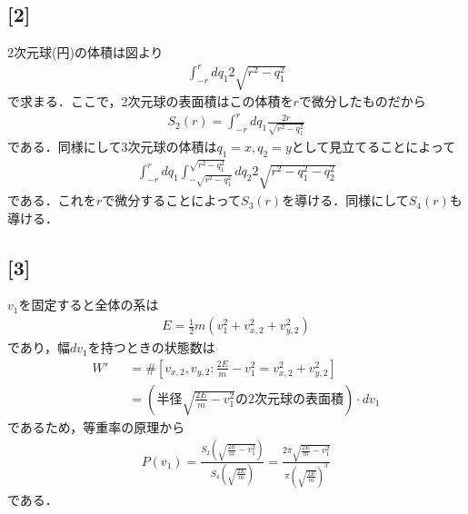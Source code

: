 \documentclass[12pt,dvipdfmx]{jsarticle}
\begin{document}
\subsection*{\large{[2]}}
2次元球(円)の体積は図より
\begin{eqnarray}
  \int_{-r}^{r} dq_1 2\sqrt{r^2-q_1^2}
\end{eqnarray}
で求まる．ここで，2次元球の表面積はこの体積を$r$で微分したものだから
\begin{eqnarray}
  S_2(r) = \int_{-r}^{r} dq_1 \frac{2r}{\sqrt{r^2-q_1^2}}
\end{eqnarray}
である．同様にして3次元球の体積は$q_1=x,q_2=y$として見立てることによって
\begin{eqnarray}
  \int_{-r}^{r}dq_1 \int_{-\sqrt{r^2-q_1^2}}^{\sqrt{r^2-q_1^2}}dq_2 2\sqrt{r^2-q_1^2-q_2^2}
\end{eqnarray}
である．これを$r$で微分することによって$S_3(r)$を導ける．同様にして$S_4(r)$も導ける．
\subsection*{\large{[3]}}
$v_1$を固定すると全体の系は
\begin{eqnarray}
  E = \frac{1}{2}m \left( v_1^2 + v_{x,2}^2 + v_{y,2}^2 \right)
\end{eqnarray}
であり，幅$dv_1$を持つときの状態数は
\begin{eqnarray}
  W'  &&= \# \left[  v_{x,2},v_{y,2}: \frac{2E}{m}-v_1^2 = v_{x,2}^2 + v_{y,2}^2 \right]\\
  &&=\left( 半径\sqrt{ \frac{2E}{m}-v_1^2 }の2次元球の表面積 \right)\cdot dv_1
\end{eqnarray}
であるため，等重率の原理から
\begin{eqnarray}
  P(v_1) = \frac{S_2\left( \sqrt{ \frac{2E}{m}-v_1^2 } \right)}{S_4\left( \sqrt{\frac{2E}{m} } \right)}= \frac{2\pi \sqrt{ \frac{2E}{m}-v_1^2 } }{ \pi \left( \sqrt{\frac{2E}{m}} \right)^3 }
\end{eqnarray}
である．
\end{document}
